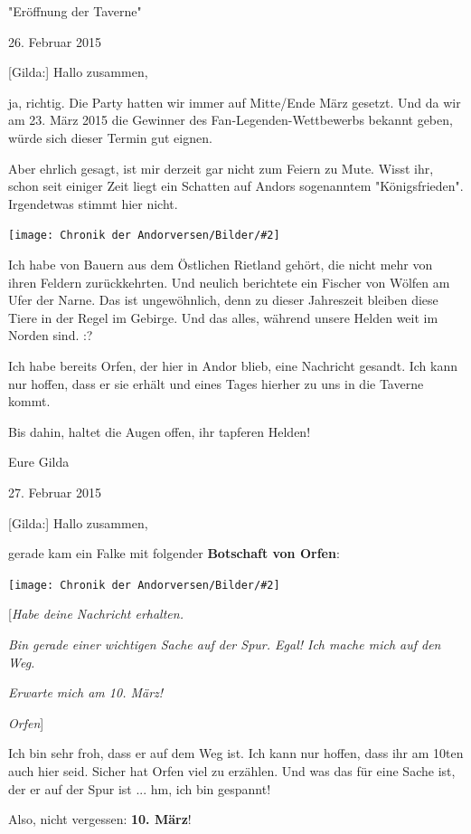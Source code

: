 \documentclass[10pt, a4paper, oneside]{book}
\newcommand{\bildmitts}[2][height=0.32\textwidth,width=0.48\textwidth,keepaspectratio]{%
    \begin{center}
        \texttt{[image: Chronik der Andorversen/Bilder/\#2]}
    \end{center}
}
\begin{document}
\begin{multicols}{2}
\begin{center}
    "Eröffnung der Taverne"

    26. Februar 2015
\end{center}


[Gilda:] Hallo zusammen,

ja, richtig. Die Party hatten wir immer auf Mitte/Ende März gesetzt. Und da wir am 23. März 2015 die Gewinner des Fan-Legenden-Wettbewerbs bekannt geben, würde sich dieser Termin gut eignen.

Aber ehrlich gesagt, ist mir derzeit gar nicht zum Feiern zu Mute. Wisst ihr, schon seit einiger Zeit liegt ein Schatten auf Andors sogenanntem "Königsfrieden". Irgendetwas stimmt hier nicht.

\bildmitts{AA2015 Eröffnung der Taverne 1.jpeg}

Ich habe von Bauern aus dem Östlichen Rietland gehört, die nicht mehr von ihren Feldern zurückkehrten. Und neulich berichtete ein Fischer von Wölfen am Ufer der Narne. Das ist ungewöhnlich, denn zu dieser Jahreszeit bleiben diese Tiere in der Regel im Gebirge.
Und das alles, während unsere Helden weit im Norden sind. :?

Ich habe bereits Orfen, der hier in Andor blieb, eine Nachricht gesandt. Ich kann nur hoffen, dass er sie erhält und eines Tages hierher zu uns in die Taverne kommt.

Bis dahin, haltet die Augen offen, ihr tapferen Helden!

Eure Gilda

\begin{center}
    27. Februar 2015
\end{center}

[Gilda:] Hallo zusammen,

gerade kam ein Falke mit folgender \textbf{Botschaft von Orfen}:

\bildmitts{Orfens Brief.jpg}

[\textit{Habe deine Nachricht erhalten.}

\textit{Bin gerade einer wichtigen Sache auf der Spur. Egal! Ich mache mich auf den Weg.}

\textit{Erwarte mich am 10. März!}

\textit{Orfen}]

Ich bin sehr froh, dass er auf dem Weg ist. Ich kann nur hoffen, dass ihr am 10ten auch hier seid. Sicher hat Orfen viel zu erzählen. Und was das für eine Sache ist, der er auf der Spur ist ... hm, ich bin gespannt!

Also, nicht vergessen: \textbf{10. März}!



\end{multicols}
\end{document}
